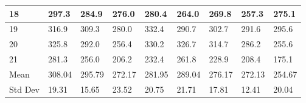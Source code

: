 \documentclass{article}
\begin{document}
\begin{table}[!htbp]
{\begin{tabular}{ |p{3cm}|| p{3cm} | p{3cm} | p{3cm} | p{3cm} | p{3cm} | p{3cm} | p{3cm} | p{3cm}| }
\hline
 18 & 297.3 & 284.9 & 276.0 & 280.4 & 264.0 & 269.8 & 257.3 & 275.1 \\ 
\hline
 19 & 316.9 & 309.3 & 280.0 & 332.4 & 290.7 & 302.7 & 291.6 & 295.6 \\ 
\hline
 20 & 325.8 & 292.0 & 256.4 & 330.2 & 326.7 & 314.7 & 286.2 & 255.6 \\ 
\hline
 21 & 281.3 & 256.0 & 206.2 & 232.4 & 261.8 & 228.9 & 208.4 & 175.1 \\ 
\hline
Mean & 308.04 & 295.79 & 272.17 & 281.95 & 289.04 & 276.17 & 272.13 & 254.67 \\ 
\hline
Std Dev & 19.31 & 15.65 & 23.52 & 20.75 & 21.71 & 17.81 & 12.41 & 20.04 \\ 
\hline
\end{tabular}%
}
\end{table}
\newpage
\end{document}
